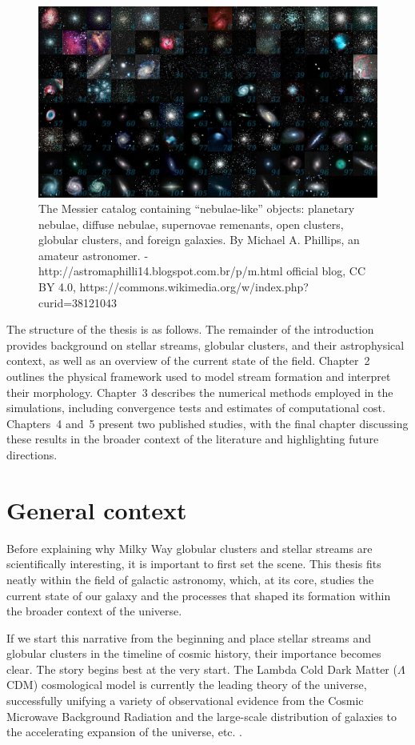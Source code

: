 \begin{figure}
    \centering
    \includegraphics[width=\linewidth]{images/All_messier_objects.jpg}
    \caption[Messer objects]{The Messier catalog containing ``nebulae-like'' objects: planetary nebulae, diffuse nebulae, supernovae remenants, open clusters, globular clusters, and foreign galaxies. By Michael A. Phillips, an amateur astronomer. - http://astromaphilli14.blogspot.com.br/p/m.html official blog, CC BY 4.0, https://commons.wikimedia.org/w/index.php?curid=38121043}
    \label{fig:All_messier_objects}
\end{figure}
The structure of the thesis is as follows. The remainder of the introduction provides background on stellar streams, globular clusters, and their astrophysical context, as well as an overview of the current state of the field. Chapter~2 outlines the physical framework used to model stream formation and interpret their morphology. Chapter~3 describes the numerical methods employed in the simulations, including convergence tests and estimates of computational cost. Chapters~4 and~5 present two published studies, with the final chapter discussing these results in the broader context of the literature and highlighting future directions.

\section{General context}
    Before explaining why Milky Way globular clusters and stellar streams are scientifically interesting, it is important to first set the scene. This thesis fits neatly within the field of galactic astronomy, which, at its core, studies the current state of our galaxy and the processes that shaped its formation within the broader context of the universe.

    If we start this narrative from the beginning and place stellar streams and globular clusters in the timeline of cosmic history, their importance becomes clear. The story begins best at the very start. The Lambda Cold Dark Matter ($\Lambda$CDM) cosmological model is currently the leading theory of the universe, successfully unifying a variety of observational evidence from the Cosmic Microwave Background Radiation and the large-scale distribution of galaxies to the accelerating expansion of the universe, etc. \citep{2001LRR.....4....1C,2022NewAR..9501659P}.

